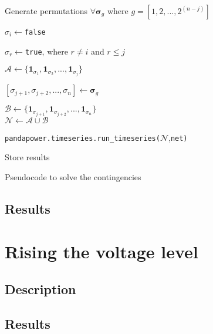 \begin{algorithm}[!htb]
\DontPrintSemicolon
  
  Generate permutations $\forall \bm{\sigma}_{g}$ where $g=[1,2,...,2^{(n-j)}]$

  {
    $\sigma_i\gets$\texttt{false}

    $\sigma_r\gets$\texttt{true}, where $r\neq i$ and $r\leq j$

    $\mathcal{A}\gets \{\mathbf{1}_{\sigma_{1}}, \mathbf{1}_{\sigma_{2}},..., \mathbf{1}_{\sigma_{j}}\}$\\

    {
      $[\sigma_{j+1}, \sigma_{j+2},..., \sigma_n] \gets \bm{\sigma}_g$

    $\mathcal{B} \gets \{\mathbf{1}_{\sigma_{j+1}}, \mathbf{1}_{\sigma_{j+2}},..., \mathbf{1}_{\sigma_{n}}\}$\\

    $\mathcal{N} \gets \mathcal{A} \cup \mathcal{B}$

    \texttt{pandapower.timeseries.run\_timeseries(}$\mathcal{N}$,\texttt{net)}

    Store results
    }
  }
\caption{Pseudocode to solve the contingencies}
\label{alg:1}
\end{algorithm}



\subsection{Results}


\section{Rising the voltage level}
\subsection{Description}
\subsection{Results}

